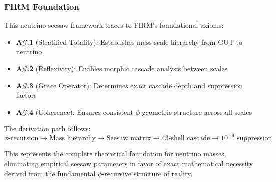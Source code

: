 \subsubsection{FIRM Foundation}

This neutrino seesaw framework traces to FIRM's foundational axioms:

\begin{itemize}
\item \textbf{A$\mathcal{G}$.1} (Stratified Totality): Establishes mass scale hierarchy from GUT to neutrino
\item \textbf{A$\mathcal{G}$.2} (Reflexivity): Enables morphic cascade analysis between scales
\item \textbf{A$\mathcal{G}$.3} (Grace Operator): Determines exact cascade depth and suppression factors
\item \textbf{A$\mathcal{G}$.4} (Coherence): Ensures consistent $\phi$-geometric structure across all scales
\end{itemize}

The derivation path follows:
$$\phi\text{-recursion} \to \text{Mass hierarchy} \to \text{Seesaw matrix} \to \text{43-shell cascade} \to 10^{-9}\text{ suppression}$$

This represents the complete theoretical foundation for neutrino masses, eliminating empirical seesaw parameters in favor of exact mathematical necessity derived from the fundamental $\phi$-recursive structure of reality.
